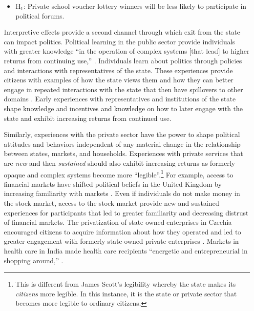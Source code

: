 \documentclass[hidelinks, 12pt, titlepage]{article}
\begin{document}
	\begin{itemize}
		\item H$_{1}$: Private school voucher lottery winners will be less likely to participate in political forums.
	\end{itemize}

	Interpretive effects provide a second channel through which exit from the state can impact politics.  Political learning in the public sector provide individuals with greater knowledge ``in the operation of complex systems [that lead] to higher returns from continuing use,'' \citep[254]{Pierson2000b}. Individuals learn about politics through policies and interactions with representatives of the state.  These experiences provide citizens with examples of how the state views them and how they can better engage in repeated interactions with the state that then have spillovers to other domains \citep{Pierson1993, Soss1999}. Early experiences with representatives and institutions of the state shape knowledge and incentives and knowledge on how to later engage with the state and exhibit increasing returns from continued use.

Similarly, experiences with the private sector have the power to shape political attitudes and behaviors independent of any material change in the relationship between states, markets, and households.  Experiences with private services that are \emph{new} and then \emph{sustained} should also exhibit increasing returns as formerly opaque and complex systems become more ``legible''.\footnote{This is different from James Scott's \citeyearpar{Scott1998} legibility whereby the state makes its \emph{citizens} more legible.  In this instance, it is the state or private sector that becomes more legible to ordinary citizens.}  For example, access to financial markets have shifted political beliefs in the United Kingdom by increasing familiarity with markets \citep{Margalit2020}.  Even if individuals do not make money in the stock market, access to the stock market provide new and sustained experiences for participants that led to greater familiarity and decreasing distrust of financial markets.  The privatization of state-owned enterprises in Czechia encouraged citizens to acquire information about how they operated and led to greater engagement with formerly state-owned private enterprises \citep{Earle2003}.  Markets in health care in India made health care recipients ``energetic and entrepreneurial in shopping around,'' \citeyearpar[133]{Jeffery2008}.
\end{document}
